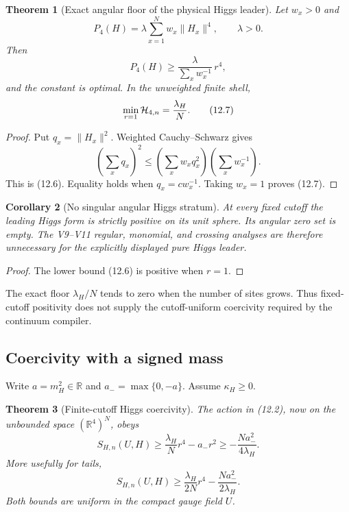 \documentclass[11pt]{article}
\newtheorem{theorem}{Theorem}[section]
\newtheorem{corollary}[theorem]{Corollary}
\theoremstyle{remark}
\begin{document}
\begin{theorem}[Exact angular floor of the physical Higgs leader]
\label{thm:v17v12-angular-floor}
Let \(w_x>0\) and
\[
 P_4(H)=\lambda\sum_{x=1}^Nw_x\|H_x\|^4,
 \qquad \lambda>0.
\]
Then
\[
 P_4(H)\geq
 \frac{\lambda}{\sum_xw_x^{-1}}\,r^4,             \tag{12.6}
\]
and the constant is optimal.  In the unweighted finite shell,
\[
 \min_{r=1}{\cal H}_{4,n}=\frac{\lambda_H}{N}.
                                                                  \tag{12.7}
\]
\end{theorem}

\begin{proof}
Put \(q_x=\|H_x\|^2\).  Weighted Cauchy--Schwarz gives
\[
 \left(\sum_xq_x\right)^2
 \leq
 \left(\sum_xw_xq_x^2\right)
 \left(\sum_xw_x^{-1}\right).
\]
This is (12.6).  Equality holds when \(q_x=cw_x^{-1}\).
Taking \(w_x=1\) proves (12.7).
\end{proof}

\begin{corollary}[No singular angular Higgs stratum]
\label{cor:v17v12-no-stratum}
At every fixed cutoff the leading Higgs form is strictly positive
on its unit sphere.  Its angular zero set is empty.  The V9--V11
regular, monomial, and crossing analyses are therefore unnecessary
for the explicitly displayed pure Higgs leader.
\end{corollary}

\begin{proof}
The lower bound (12.6) is positive when \(r=1\).
\end{proof}

The exact floor \(\lambda_H/N\) tends to zero when the number of
sites grows.  Thus fixed-cutoff positivity does not supply the
cutoff-uniform coercivity required by the continuum compiler.

\subsection{Coercivity with a signed mass}

Write \(a=m_H^2\in\mathbb R\) and
\(a_-=\max\{0,-a\}\).  Assume \(\kappa_H\geq0\).

\begin{theorem}[Finite-cutoff Higgs coercivity]
\label{thm:v17v12-coercivity}
The action in (12.2), now on the unbounded space
\((\mathbb R^4)^N\), obeys
\[
 S_{H,n}(U,H)
 \geq \frac{\lambda_H}{N}r^4-a_-r^2
 \geq-\frac{Na_-^2}{4\lambda_H}.                  \tag{12.8}
\]
More usefully for tails,
\[
 S_{H,n}(U,H)
 \geq
 \frac{\lambda_H}{2N}r^4
 -\frac{Na_-^2}{2\lambda_H}.                      \tag{12.9}
\]
Both bounds are uniform in the compact gauge field \(U\).
\end{theorem}
\end{document}
